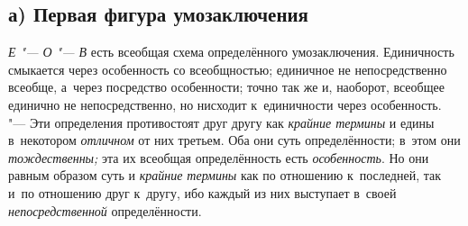 \subsection[а) Первая фигура умозаключения]{а) Первая фигура умозаключения}

{\em Е "--- О "--- В}
есть всеобщая схема определённого умозаключения. Единичность
смыкается через особенность со всеобщностью; единичное не непосредственно
всеобще, а~через посредство особенности; точно так же и, наоборот, всеобщее
единично не непосредственно, но нисходит к~единичности через особенность.
"--- Эти определения противостоят друг другу как
{\em крайние термины} и
едины в~некотором {\em отличном}
от них третьем. Оба они суть определённости; в~этом они
{\em тождественны;} эта
их всеобщая определённость есть
{\em особенность}. Но они
равным образом суть и {\em крайние
термины} как по отношению к~последней, так и~по отношению
друг к~другу, ибо каждый из них выступает в~своей
{\em непосредственной}
определённости.

